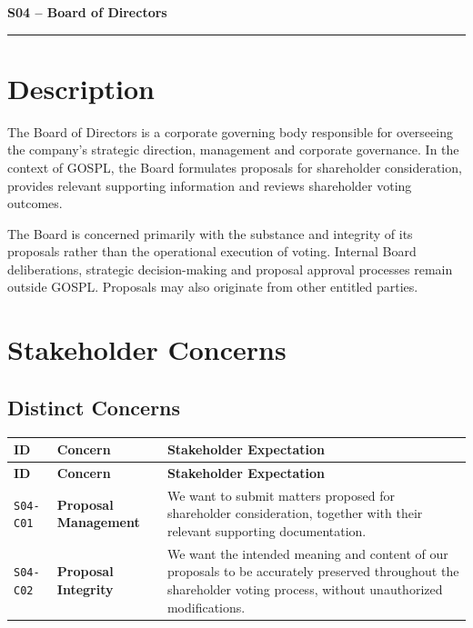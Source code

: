 \documentclass[11pt,a4paper]{article}
\begin{document}

{\LARGE\bfseries S04 -- Board of Directors\par}\vspace{1em}
\noindent\rule{\linewidth}{0.4pt}

\section*{Description}

The Board of Directors is a corporate governing body responsible for overseeing the company's strategic direction, management and corporate governance. In the context of GOSPL, the Board formulates proposals for shareholder consideration, provides relevant supporting information and reviews shareholder voting outcomes.

The Board is concerned primarily with the substance and integrity of its proposals rather than the operational execution of voting. Internal Board deliberations, strategic decision-making and proposal approval processes remain outside GOSPL. Proposals may also originate from other entitled parties.

\section*{Stakeholder Concerns}

\subsection*{Distinct Concerns}

\begingroup\small
\begin{longtable}{@{}>{\raggedright\arraybackslash}p{}>{\raggedright\arraybackslash}p{}>{\raggedright\arraybackslash}p{}@{}}
\toprule
\textbf{ID} & \textbf{Concern} & \textbf{Stakeholder Expectation} \\
\midrule
\endfirsthead
\toprule
\textbf{ID} & \textbf{Concern} & \textbf{Stakeholder Expectation} \\
\midrule
\endhead
\bottomrule
\endfoot
\texttt{S04-C01} & \textbf{Proposal Management} & We want to submit matters proposed for shareholder consideration, together with their relevant supporting documentation. \\
\addlinespace
\texttt{S04-C02} & \textbf{Proposal Integrity} & We want the intended meaning and content of our proposals to be accurately preserved throughout the shareholder voting process, without unauthorized modifications. \\
\end{longtable}
\endgroup
\end{document}

